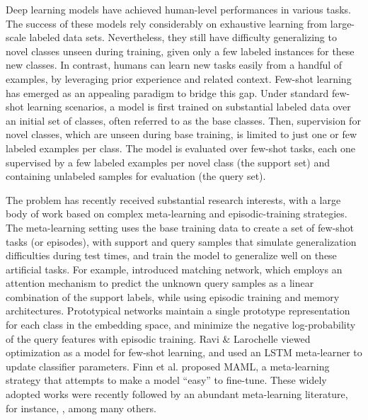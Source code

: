 \documentclass{article}
\begin{document}
Deep learning models have achieved human-level performances in various tasks. The success of these models rely considerably on exhaustive learning from large-scale labeled data sets. 
Nevertheless, they still have difficulty generalizing to novel classes unseen during training, given only a few labeled instances for these new classes. In contrast, humans can 
learn new tasks easily from a handful of examples, by leveraging prior experience and related context. Few-shot learning \cite{fei2006one,Miller-Matsakis-Viola2000,Vinyals2016MatchingNF} 
has emerged as an appealing paradigm to bridge this gap. Under standard few-shot learning scenarios, a model is first trained on substantial labeled data over an initial set of classes, 
often referred to as the base classes. Then, supervision for novel classes, which are unseen during base training, is limited to just one or few labeled examples per class. The model 
is evaluated over few-shot tasks, each one supervised by a few labeled examples per novel class (the support set) and containing unlabeled samples for evaluation (the query set).

The problem has recently received substantial research interests, with a large body of work based on complex meta-learning and episodic-training strategies. The meta-learning setting uses the base training data to create a set of few-shot tasks (or episodes), with support and query samples that simulate generalization difficulties during test times, and train the model to generalize well on these artificial tasks. For example, \cite{Vinyals2016MatchingNF} introduced matching network, which employs an attention mechanism to predict the unknown query samples as a linear combination of the support labels, while using episodic training and memory architectures. Prototypical networks \cite{snell2017prototypical} maintain a single prototype representation for each class in the embedding space, and minimize the negative log-probability of the query features with episodic training. Ravi \& Larochelle \citeyearpar{Ravi2017OptimizationAA} viewed optimization as a model for few-shot learning, and used an LSTM meta-learner to update classifier parameters. Finn et al. \citeyearpar{Finn2017ModelAgnosticMF} proposed MAML, a meta-learning strategy that attempts to make a model ``easy'' to fine-tune. These widely adopted works were recently followed by an abundant meta-learning literature, for instance, \cite{sung2018learning,oreshkin2018tadam, mishra2018a, rusu2018metalearning, liu2018learning,can,ye2020fewshot}, among many others.
\end{document}
